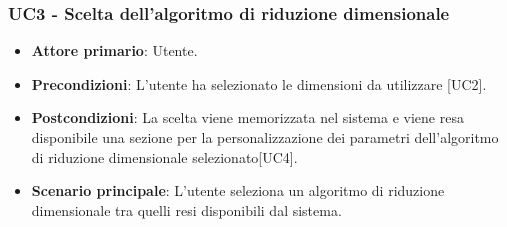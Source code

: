 \subsubsection{UC3 - Scelta dell'algoritmo di riduzione dimensionale}
\begin{itemize}
	\item \textbf{Attore primario}: Utente.
	\item \textbf{Precondizioni}: L'utente ha selezionato le dimensioni da utilizzare [UC2].
	\item \textbf{Postcondizioni}: La scelta viene memorizzata nel sistema e viene resa disponibile una sezione per la personalizzazione dei parametri dell'algoritmo di riduzione dimensionale selezionato[UC4].
	\item \textbf{Scenario principale}: L'utente seleziona un algoritmo di riduzione dimensionale tra quelli resi disponibili dal sistema.
\end{itemize}
